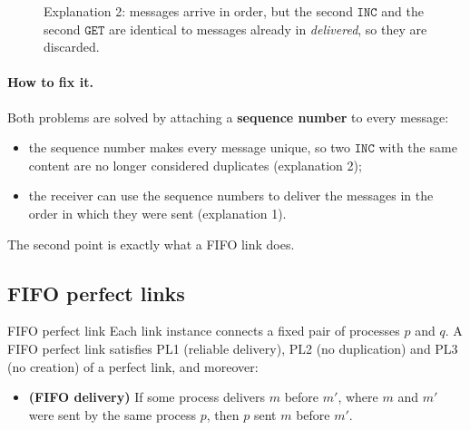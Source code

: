 \begin{figure}[H]
  \centering
  \caption{Explanation 2: messages arrive in order, but the second $\texttt{INC}$ and the second $\texttt{GET}$ are identical to messages already in \textit{delivered}, so they are discarded.}
\end{figure}

\paragraph{How to fix it.} Both problems are solved by attaching a \textbf{sequence number} to every message:
\begin{itemize}
  \item the sequence number makes every message unique, so two $\texttt{INC}$ with the same content are no longer considered duplicates (explanation 2);
  \item the receiver can use the sequence numbers to deliver the messages in the order in which they were sent (explanation 1).
\end{itemize}
The second point is exactly what a FIFO link does.

\subsection{FIFO perfect links}

\begin{frameddefn}{FIFO perfect link}
  Each link instance connects a fixed pair of processes $p$ and $q$. A FIFO perfect link satisfies PL1 (reliable delivery), PL2 (no duplication) and PL3 (no creation) of a perfect link, and moreover:
  \begin{itemize}[leftmargin=3.4em]
    \item[\textbf{FIFO}] \textbf{(FIFO delivery)} If some process delivers $m$ before $m'$, where $m$ and $m'$ were sent by the same process $p$, then $p$ sent $m$ before $m'$.
  \end{itemize}
\end{frameddefn}

